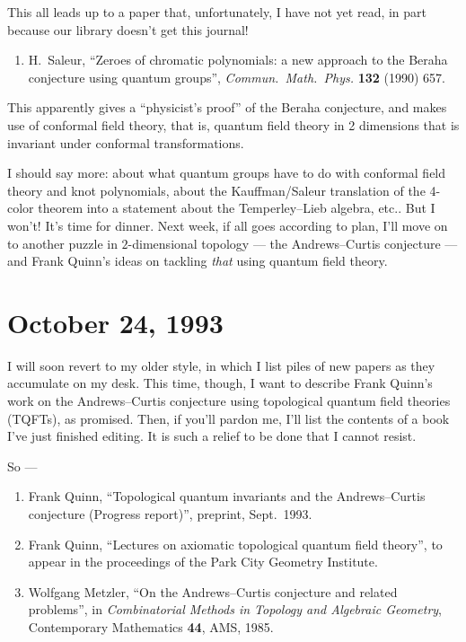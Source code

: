\documentclass{article}
\def\tightlist{}
\begin{document}
This all leads up to a paper that, unfortunately, I have not yet read,
in part because our library doesn't get this journal!

\begin{enumerate}
\def\labelenumi{\arabic{enumi})}
\setcounter{enumi}{4}
\tightlist
\item
  H.\ Saleur, ``Zeroes of chromatic polynomials: a new approach to the Beraha
  conjecture using quantum groups'', \emph{Commun.\ Math.\
  Phys.} \textbf{132} (1990) 657.
\end{enumerate}

This apparently gives a ``physicist's proof'' of the Beraha conjecture,
and makes use of conformal field theory, that is, quantum field theory
in 2 dimensions that is invariant under conformal transformations.

I should say more: about what quantum groups have to do with conformal
field theory and knot polynomials, about the Kauffman/Saleur translation
of the 4-color theorem into a statement about the Temperley--Lieb
algebra, etc.. But I won't! It's time for dinner. Next week, if all goes
according to plan, I'll move on to another puzzle in \(2\)-dimensional
topology --- the Andrews--Curtis conjecture --- and Frank Quinn's ideas on
tackling \emph{that} using quantum field theory.



\hypertarget{week23}{%
\section{October 24, 1993}\label{week23}}

I will soon revert to my older style, in which I list piles of new
papers as they accumulate on my desk. This time, though, I want to
describe Frank Quinn's work on the Andrews--Curtis conjecture using
topological quantum field theories (TQFTs), as promised. Then, if you'll
pardon me, I'll list the contents of a book I've just finished editing.
It is such a relief to be done that I cannot resist.

So ---

\begin{enumerate}
\def\labelenumi{\arabic{enumi})}
\item Frank Quinn,
  ``Topological quantum invariants and the Andrews--Curtis conjecture
  (Progress report)'', preprint, Sept.~1993.
\item
  Frank Quinn, ``Lectures on axiomatic topological quantum field theory'', to appear in the proceedings of the Park City Geometry
  Institute.
\item
  Wolfgang
  Metzler, ``On the Andrews--Curtis conjecture and related problems'', in \emph{Combinatorial Methods in Topology and Algebraic
  Geometry}, Contemporary Mathematics \textbf{44}, AMS, 1985.
\end{enumerate}
\end{document}
